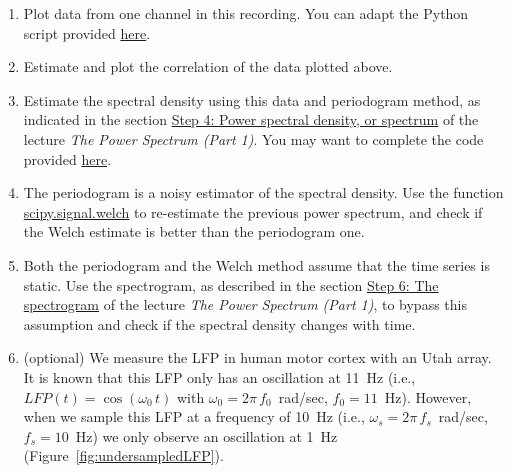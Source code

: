 \documentclass[12pt]{article}
\begin{document}
\begin{enumerate}

    \item Plot data from one channel in this recording. You can adapt the
        Python script provided
        \href{https://github.com/joacorapela/statNeuro2025/blob/master/worksheets/03_spectralTimeSeriesAnalysis/doPlotData.py}{here}.

    \item Estimate and plot the correlation of the data plotted above.

    \item Estimate the spectral density using this data and periodogram method,
        as indicated in the section
        \href{https://mark-kramer.github.io/Case-Studies-Python/03.html#step-4-power-spectral-density-or-spectrum}{Step
        4: Power spectral density, or spectrum} of the lecture \emph{The Power
        Spectrum (Part 1)}. You may want to complete the code provided
        \href{https://github.com/joacorapela/statNeuro2025/blob/master/worksheets/03_spectralTimeSeriesAnalysis/doPeriodogram.py}{here}.

    \item The periodogram is a noisy estimator of the spectral
        density. Use the function
        \href{https://docs.scipy.org/doc/scipy/reference/generated/scipy.signal.welch.html#scipy.signal.welch}{scipy.signal.welch} to re-estimate
        the previous power spectrum, and check if the Welch estimate is better
        than the periodogram one.

    \item Both the periodogram and the Welch method assume that the time series
        is static. Use the spectrogram, as described in the section
        \href{https://hub.2i2c.mybinder.org/user/mark-kramer-case-studies-python-vd53gjx8/notebooks/03.ipynb#the-spectrogram}{Step
        6: The spectrogram} of the lecture \emph{The Power Spectrum (Part 1)},
        to bypass this assumption and check if the spectral density changes
        with time.

    \item (optional) We measure the LFP in human motor cortex with an Utah array. It is
        known that this LFP only has an oscillation at 11~Hz (i.e.,
        $LFP(t)=\cos(\omega_0\,t)$ with $\omega_0=2\pi\,f_0$~rad/sec,
        $f_0=11$~Hz). However, when we sample this LFP at a frequency of 10~Hz
        (i.e., $\omega_s=2\pi\,f_s$~rad/sec, $f_s=10$~Hz) we only observe an
        oscillation at 1~Hz (Figure~\ref{fig:undersampledLFP}).


\end{enumerate}
\end{document}
